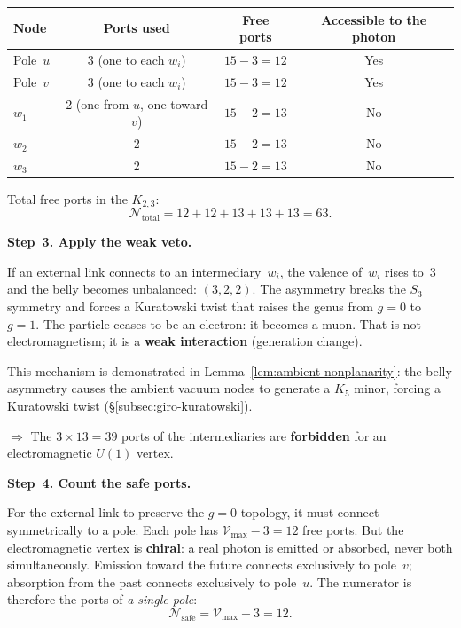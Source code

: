 \smallskip
\begin{center}
\renewcommand{\arraystretch}{1.2}
\begin{tabular}{lccc}
\toprule
\textbf{Node} & \textbf{Ports used} & \textbf{Free ports}
  & \textbf{Accessible to the photon} \\
\midrule
Pole~$u$   & 3 (one to each $w_i$) & $15 - 3 = 12$ & Yes \\
Pole~$v$   & 3 (one to each $w_i$) & $15 - 3 = 12$ & Yes \\
$w_1$      & 2 (one from $u$, one toward $v$) & $15 - 2 = 13$ & No \\
$w_2$      & 2 & $15 - 2 = 13$ & No \\
$w_3$      & 2 & $15 - 2 = 13$ & No \\
\bottomrule
\end{tabular}
\end{center}

\smallskip
\noindent
Total free ports in the $K_{2,3}$:
\[
  \mathcal{N}_{\text{total}} = 12 + 12 + 13 + 13 + 13 = 63.
\]

\bigskip
\noindent
\textbf{Step~3. Apply the weak veto.}

If an external link connects to an intermediary~$w_i$, the valence
of~$w_i$ rises to~3 and the belly becomes unbalanced: $(3, 2, 2)$. The
asymmetry breaks the $S_3$ symmetry and forces a Kuratowski twist that
raises the genus from $g = 0$ to $g = 1$. The particle ceases to be an
electron: it becomes a muon. That is not electromagnetism; it is a
\textbf{weak interaction} (generation change).

This mechanism is demonstrated in
Lemma~\ref{lem:ambient-nonplanarity}: the belly asymmetry causes the
ambient vacuum nodes to generate a $K_5$ minor, forcing a Kuratowski
twist (\S\ref{subsec:giro-kuratowski}).

$\Longrightarrow$ The $3 \times 13 = 39$ ports of the intermediaries are
\textbf{forbidden} for an electromagnetic $U(1)$ vertex.

\bigskip
\noindent
\textbf{Step~4. Count the safe ports.}

For the external link to preserve the $g = 0$ topology, it must connect
symmetrically to a pole. Each pole has
$\mathcal{V}_{\max} - 3 = 12$ free ports. But the electromagnetic vertex
is \textbf{chiral}: a real photon is emitted or absorbed, never both
simultaneously. Emission toward the future connects exclusively to
pole~$v$; absorption from the past connects exclusively to pole~$u$. The
numerator is therefore the ports of \emph{a single pole}:
\[
  \mathcal{N}_{\text{safe}} = \mathcal{V}_{\max} - 3 = 12.
\]

